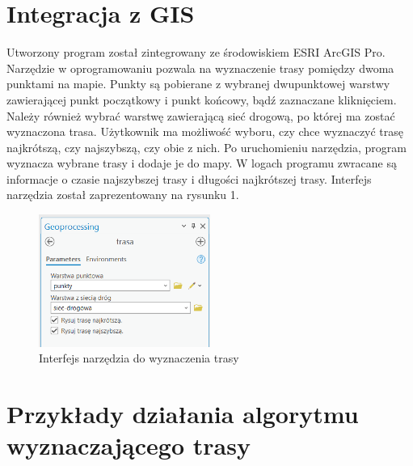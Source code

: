 \documentclass{article}
\begin{document}
\section{Integracja z GIS}
Utworzony program został zintegrowany ze środowiskiem ESRI ArcGIS Pro. Narzędzie w oprogramowaniu pozwala na wyznaczenie trasy pomiędzy dwoma punktami na mapie. 
Punkty są pobierane z wybranej dwupunktowej warstwy zawierającej punkt początkowy i punkt końcowy, bądź zaznaczane kliknięciem. Należy również wybrać warstwę zawierającą sieć drogową, po której ma zostać wyznaczona trasa. Użytkownik ma możliwość wyboru, czy chce wyznaczyć trasę najkrótszą, czy najszybszą, czy obie z nich. Po uruchomieniu narzędzia, program wyznacza wybrane trasy i dodaje je do mapy. W logach programu zwracane są informacje o czasie najszybszej trasy i długości najkrótszej trasy. Interfejs narzędzia został zaprezentowany na rysunku 1.

\begin{figure}[H]
    \centering
    \includegraphics[width=0.5\textwidth]{img/narzedzie-interfejs-trasa.png}
    \caption{Interfejs narzędzia do wyznaczenia trasy}
\end{figure}

\section{Przykłady działania algorytmu wyznaczającego trasy}
\end{document}
